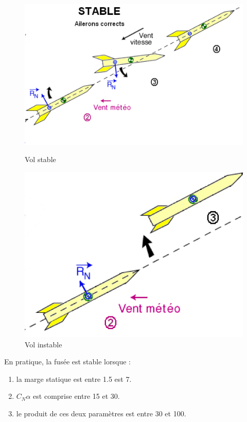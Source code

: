 \documentclass[a4paper]{article}
\begin{document}
\begin{figure}[h!]
  \centering
  \begin{minipage}[b]{0.4\textwidth}
    \includegraphics[width=\textwidth]{pictures/stable.png}
    \caption{Vol stable}
  \end{minipage}
  \hfill
  \begin{minipage}[b]{0.4\textwidth}
    \includegraphics[width=\textwidth]{pictures/instable.png}
    \caption{Vol instable}
  \end{minipage}
\end{figure}

En pratique, la fusée est stable lorsque :
\begin{enumerate}
\item la marge statique est entre 1.5 est 7.
\item  \textbf{$C_{N}\alpha$} est comprise entre 15 et 30.
\item le produit de ces deux paramètres est entre 30 et 100.
\end{enumerate}
\end{document}
